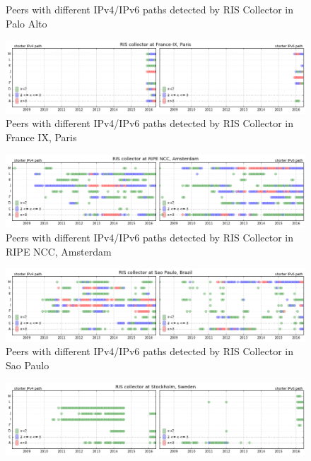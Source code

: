 \begin{appendices}
\begin{figure}[!htb]
		\caption{Peers with different IPv4/IPv6 paths detected by RIS Collector in Palo Alto}
		\label{fig:coll-palo-alto}
	\end{figure}	
	\begin{figure}[!htb]
		\centering
		\includegraphics[width=6.0in]{img/coll-paris.png}
		\caption{Peers with different IPv4/IPv6 paths detected by RIS Collector in France IX, Paris}
		\label{fig:coll-paris}
	\end{figure}	
	\begin{figure}[!htb]
		\centering
		\includegraphics[width=6.0in]{img/coll-ripe-ncc.png}
		\caption{Peers with different IPv4/IPv6 paths detected by RIS Collector in RIPE NCC, Amsterdam}
		\label{fig:coll-ripe-ncc}
	\end{figure}	
	\begin{figure}[!htb]
		\centering
		\includegraphics[width=6.0in]{img/coll-sao-paulo.png}
		\caption{Peers with different IPv4/IPv6 paths detected by RIS Collector in Sao Paulo}
		\label{fig:coll-sao-paulo}
	\end{figure}	
	\begin{figure}[!htb]
		\centering
		\includegraphics[width=6.0in]{img/coll-stockholm.png}

\end{figure}
\end{appendices}
